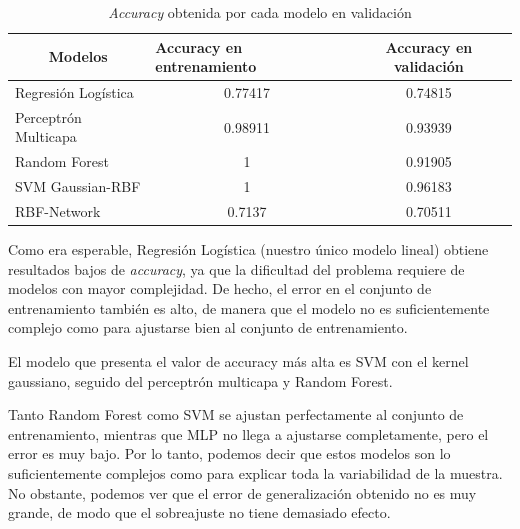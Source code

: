 \documentclass[a4]{article}
\begin{document}
\begin{table}[H]
	\centering
    \begin{tabular}{|l|c|c|}
    \hline
    \multicolumn{1}{|c|}{\textbf{Modelos}} & \multicolumn{1}{l|}{\textbf{Accuracy en entrenamiento}} & \textbf{Accuracy en validación} \\ \hline
    Regresión Logística                    & 0.77417                                                 & 0.74815                         \\ \hline
    Perceptrón Multicapa                   & 0.98911                                                 & 0.93939                         \\ \hline
    Random Forest                          & 1                                                       & 0.91905                         \\ \hline
    SVM Gaussian-RBF                       & 1                                                       & 0.96183                         \\ \hline
    RBF-Network                            & 0.7137                                                & 0.70511                      \\ \hline
    \end{tabular}
	\caption{\textit{Accuracy} obtenida por cada modelo en validación}
	\label{table:validacion}
\end{table}

Como era esperable, Regresión Logística (nuestro único modelo lineal) obtiene resultados bajos de \textit{accuracy}, ya que la dificultad del problema requiere de modelos con mayor complejidad. De hecho, el error en el conjunto de entrenamiento también es alto, de manera que el modelo no es suficientemente complejo como para ajustarse bien al conjunto de entrenamiento.  

El modelo que presenta el valor de accuracy más alta es SVM con el kernel gaussiano, seguido del perceptrón multicapa y Random Forest.  

Tanto Random Forest como SVM se ajustan perfectamente al conjunto de entrenamiento, mientras que MLP no llega a ajustarse completamente, pero el error es muy bajo.  Por lo tanto, podemos decir que estos modelos son lo suficientemente complejos como para explicar toda la variabilidad de la muestra. No obstante, podemos ver que el error de generalización obtenido no es muy grande, de modo que el sobreajuste no tiene demasiado efecto. 
\end{document}
